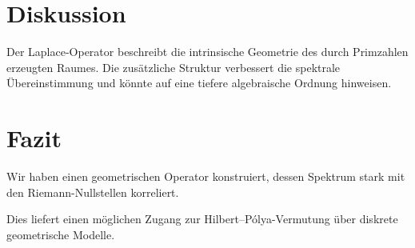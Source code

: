 \documentclass[11pt,a4paper]{article}
\begin{document}
	\section{Diskussion}
	
	Der Laplace-Operator beschreibt die intrinsische Geometrie
	des durch Primzahlen erzeugten Raumes. Die zusätzliche
	Struktur verbessert die spektrale Übereinstimmung und
	könnte auf eine tiefere algebraische Ordnung hinweisen.
	
	\section{Fazit}
	
	Wir haben einen geometrischen Operator konstruiert,
	dessen Spektrum stark mit den Riemann-Nullstellen korreliert.
	
	Dies liefert einen möglichen Zugang zur Hilbert--Pólya-Vermutung
	über diskrete geometrische Modelle.
	
\end{document}

